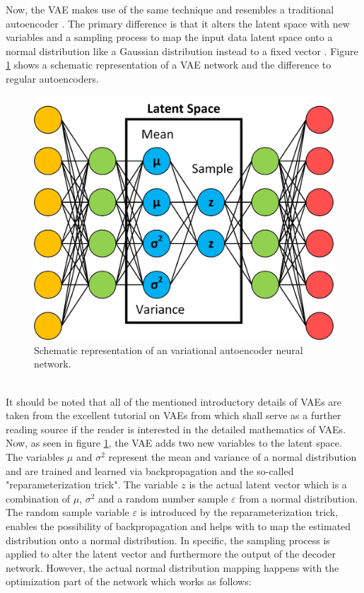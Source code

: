 \documentclass[MGS,Master,english]{twbook}%
\begin{document}
Now, the \ac{VAE} makes use of the same technique and resembles a traditional autoencoder \cite{ml::vae::tutorial}. The primary difference is that it alters the latent space with new variables and a sampling process to map the input data latent space onto a normal distribution like a Gaussian distribution instead to a fixed vector \cite{ml::vae::tutorial}. Figure \ref{fig::vae} shows a schematic representation of a VAE network and the difference to regular autoencoders. 
\begin{figure}[!htbp]
	\centering
	\includegraphics[width=0.65\linewidth]{PICs/NNs/variational_autoencoder}
	\caption{Schematic representation of an variational autoencoder neural network.} \label{fig::vae}
\end{figure}\\
It should be noted that all of the mentioned introductory details of VAEs are taken from the excellent tutorial on VAEs from \citep{ml::vae::tutorial} which shall serve as a further reading source if the reader is interested in the detailed mathematics of VAEs.\\
Now, as seen in figure \ref{fig::vae}, the VAE adds two new variables to the latent space. The variables $\mu$ and $\sigma^{2}$ represent the mean and variance of a normal distribution and are trained and learned via backpropagation and the so-called "reparameterization trick". The variable $z$ is the actual latent vector which is a combination of $\mu$, $\sigma^{2}$ and a random number sample $\varepsilon$ from a normal distribution. The random sample variable $\varepsilon$ is introduced by the reparameterization trick, enables the possibility of backpropagation and helps with to map the estimated distribution onto a normal distribution. In specific, the sampling process is applied to alter the latent vector and furthermore the output of the decoder network. However, the actual normal distribution mapping happens with the optimization part of the network which works as follows:
\end{document}
